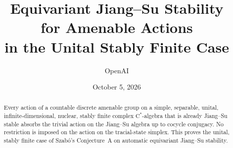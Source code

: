 \documentclass[11pt,a4paper]{article}
\title{Equivariant Jiang--Su Stability\\for Amenable Actions\\in the Unital Stably Finite Case}
\author{OpenAI}
\date{October 5, 2026}
\numberwithin{equation}{section}
\theoremstyle{definition}
\theoremstyle{remark}
\begin{document}
\maketitle
\begin{abstract}
Every action of a countable discrete amenable group on a simple,
separable, unital, infinite-dimensional, nuclear, stably finite complex
\(\mathrm C^*\)-algebra that is already Jiang--Su stable absorbs the
trivial action on the Jiang--Su algebra up to cocycle conjugacy.
No restriction is imposed on the action on the tracial-state simplex.
This proves the unital, stably finite case of Szab\'o's Conjecture~A
on automatic equivariant Jiang--Su stability.
\end{abstract}






\end{document}
